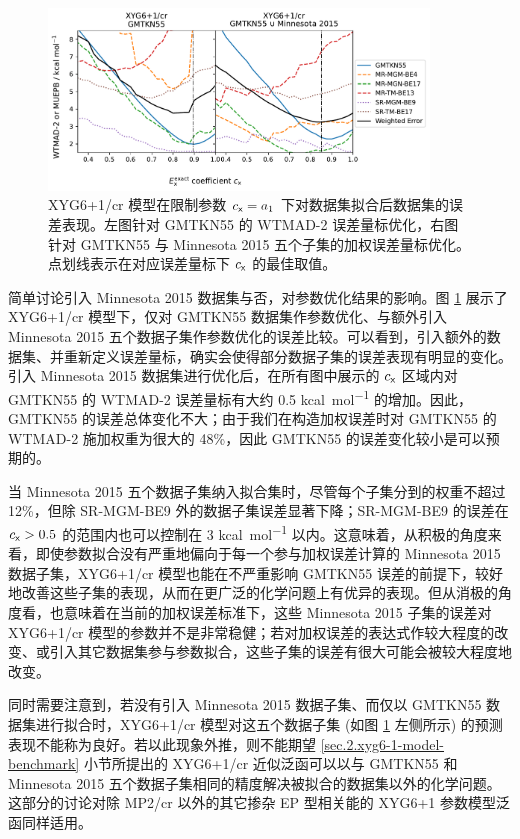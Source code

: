\begin{figure}[t]
  \centering
  \includegraphics[width=0.9\textwidth]{assets/plot-seq-cr.pdf}
  \caption[XYG6+1/cr 模型在限制 $E_\textmt{x}^\textmt{exact}$ 系数下不同参数优化策略测评误差]{XYG6+1/cr 模型在限制参数 $c_{\textsf{x}} = a_1$ 下对数据集拟合后数据集的误差表现。左图针对 GMTKN55 的 WTMAD-2 误差量标优化，右图针对 GMTKN55 与 Minnesota 2015 五个子集的加权误差量标优化。点划线表示在对应误差量标下 $c_{\textsf{x}}$ 的最佳取值。}
  \label{fig.2.plot-seq-xyg7}
\end{figure}

简单讨论引入 Minnesota 2015 数据集与否，对参数优化结果的影响。图 \ref{fig.2.plot-seq-xyg7} 展示了 XYG6+1/cr 模型下，仅对 GMTKN55 数据集作参数优化、与额外引入 Minnesota 2015 五个数据子集作参数优化的误差比较。可以看到，引入额外的数据集、并重新定义误差量标，确实会使得部分数据子集的误差表现有明显的变化。引入 Minnesota 2015 数据集进行优化后，在所有图中展示的 $c_{\textsf{x}}$ 区域内对 GMTKN55 的 WTMAD-2 误差量标有大约 0.5 \si{kcal.mol^{-1}} 的增加。因此，GMTKN55 的误差总体变化不大；由于我们在构造加权误差时对 GMTKN55 的 WTMAD-2 施加权重为很大的 48\%，因此 GMTKN55 的误差变化较小是可以预期的。

当 Minnesota 2015 五个数据子集纳入拟合集时，尽管每个子集分到的权重不超过 12\%，但除 SR-MGM-BE9 外的数据子集误差显著下降；SR-MGM-BE9 的误差在 $c_{\textsf{x}} > 0.5$ 的范围内也可以控制在 3 \si{kcal.mol^{-1}} 以内。这意味着，从积极的角度来看，即使参数拟合没有严重地偏向于每一个参与加权误差计算的 Minnesota 2015 数据子集，XYG6+1/cr 模型也能在不严重影响 GMTKN55 误差的前提下，较好地改善这些子集的表现，从而在更广泛的化学问题上有优异的表现。但从消极的角度看，也意味着在当前的加权误差标准下，这些 Minnesota 2015 子集的误差对 XYG6+1/cr 模型的参数并不是非常稳健；若对加权误差的表达式作较大程度的改变、或引入其它数据集参与参数拟合，这些子集的误差有很大可能会被较大程度地改变。

同时需要注意到，若没有引入 Minnesota 2015 数据子集、而仅以 GMTKN55 数据集进行拟合时，XYG6+1/cr 模型对这五个数据子集 (如图 \ref{fig.2.plot-seq-xyg7} 左侧所示) 的预测表现不能称为良好。若以此现象外推，则不能期望 \ref{sec.2.xyg6-1-model-benchmark} 小节所提出的 XYG6+1/cr 近似泛函可以以与 GMTKN55 和 Minnesota 2015 五个数据子集相同的精度解决被拟合的数据集以外的化学问题。这部分的讨论对除 MP2/cr 以外的其它掺杂 EP 型相关能的 XYG6+1 参数模型泛函同样适用。

